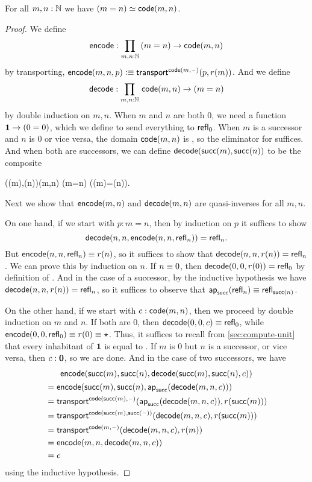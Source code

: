 \begin{thm}\label{thm:path-nat}
  For all $m,n:\mathbb{N}$ we have $(m=n) \simeq \mathsf{code}(m,n)$.
\end{thm}
\begin{proof}
  We define
  \[ \encode : \prd{m,n:\N} (m=n) \to \code(m,n) \]
  by transporting, $\mathsf{encode}(m,n,p) \vcentcolon\equiv \mathsf{transport}^{\mathsf{code}(m,{\mathord{\hspace{1pt}\text{--}\hspace{1pt}}})}(p,r(m))$.
  And we define
  \[ \decode : \prd{m,n:\N} \code(m,n) \to (m=n) \]
  by double induction on $m,n$.
  When $m$ and $n$ are both $0$, we need a function $\mathbf{1} \to (0=0)$, which we define to send everything to $\mathsf{refl}_{0}$.
  When $m$ is a successor and $n$ is $0$ or vice versa, the domain $\mathsf{code}(m,n)$ is \emptyt, so the eliminator for \emptyt suffices.
  And when both are successors, we can define $\mathsf{decode}(\mathsf{succ}(m),\mathsf{succ}(n))$ to be the composite
  \begin{narrowmultline*}
    \code(\suc(m),\suc(n))\jdeq\code(m,n)
     \narrowbreak
    (m=n)
    \xrightarrow{\apfunc{\suc}}
    (\suc(m)=\suc(n)).
  \end{narrowmultline*}
  Next we show that $\mathsf{encode}(m,n)$ and $\mathsf{decode}(m,n)$ are quasi-inverses for all $m,n$.

  On one hand, if we start with $p:m=n$, then by induction on $p$ it suffices to show
  \[\mathsf{decode}(n,n,\mathsf{encode}(n,n,\mathsf{refl}_{n}))=\mathsf{refl}_{n}.\]
  But $\mathsf{encode}(n,n,\mathsf{refl}_{n}) \equiv r(n)$, so it suffices to show that $\mathsf{decode}(n,n,r(n)) =\mathsf{refl}_{n}$.
  We can prove this by induction on $n$.
  If $n\equiv 0$, then $\mathsf{decode}(0,0,r(0)) =\mathsf{refl}_{0}$ by definition of \decode.
  And in the case of a successor, by the inductive hypothesis we have $\mathsf{decode}(n,n,r(n)) = \mathsf{refl}_{n}$, so it suffices to observe that $\mathsf{ap}_{\mathsf{succ}}(\mathsf{refl}_{n}) \equiv \mathsf{refl}_{\mathsf{succ}(n)}$.

  On the other hand, if we start with $c:\mathsf{code}(m,n)$, then we proceed by double induction on $m$ and $n$.
  If both are $0$, then $\mathsf{decode}(0,0,c) \equiv \mathsf{refl}_{0}$, while $\mathsf{encode}(0,0,\mathsf{refl}_{0})\equiv r(0) \equiv \star$.
  Thus, it suffices to recall from \autoref{sec:compute-unit} that every inhabitant of $\mathbf{1}$ is equal to \ttt.
  If $m$ is $0$ but $n$ is a successor, or vice versa, then $c:\mathbf{0}$, so we are done.
  And in the case of two successors, we have
  \begin{multline*}
    \mathsf{encode}(\mathsf{succ}(m),\mathsf{succ}(n),\mathsf{decode}(\mathsf{succ}(m),\mathsf{succ}(n),c))\\
    \begin{aligned}
    &= \mathsf{encode}(\mathsf{succ}(m),\mathsf{succ}(n),\mathsf{ap}_{\mathsf{succ}}(\mathsf{decode}(m,n,c)))\\
    &= \mathsf{transport}^{\mathsf{code}(\mathsf{succ}(m),{\mathord{\hspace{1pt}\text{--}\hspace{1pt}}})}(\mathsf{ap}_{\mathsf{succ}}(\mathsf{decode}(m,n,c)),r(\mathsf{succ}(m)))\\
    &= \mathsf{transport}^{\mathsf{code}(\mathsf{succ}(m),\mathsf{succ}({\mathord{\hspace{1pt}\text{--}\hspace{1pt}}}))}(\mathsf{decode}(m,n,c),r(\mathsf{succ}(m)))\\
    &= \mathsf{transport}^{\mathsf{code}(m,{\mathord{\hspace{1pt}\text{--}\hspace{1pt}}})}(\mathsf{decode}(m,n,c),r(m))\\
    &= \mathsf{encode}(m,n,\mathsf{decode}(m,n,c))\\
    &= c
  \end{aligned}
  \end{multline*}
  using the inductive hypothesis.
\end{proof}

